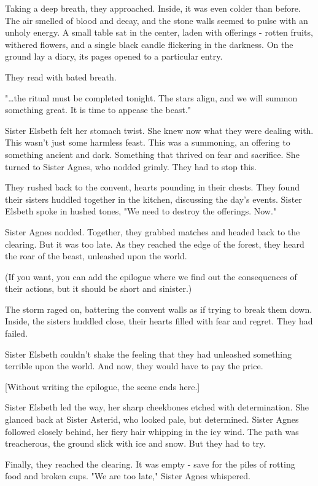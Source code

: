 \documentclass[11pt]{article}
\begin{document}
Taking a deep breath, they approached. Inside, it was even colder than before. The air smelled of blood and decay, and the stone walls seemed to pulse with an unholy energy. A small table sat in the center, laden with offerings - rotten fruits, withered flowers, and a single black candle flickering in the darkness. On the ground lay a diary, its pages opened to a particular entry.

They read with bated breath.

"\ldots{}the ritual must be completed tonight. The stars align, and we will summon something great. It is time to appease the beast."

Sister Elsbeth felt her stomach twist. She knew now what they were dealing with. This wasn't just some harmless feast. This was a summoning, an offering to something ancient and dark. Something that thrived on fear and sacrifice. She turned to Sister Agnes, who nodded grimly. They had to stop this.

They rushed back to the convent, hearts pounding in their chests. They found their sisters huddled together in the kitchen, discussing the day's events. Sister Elsbeth spoke  in hushed tones, "We need to destroy the offerings. Now."

Sister Agnes nodded. Together, they grabbed matches and headed back to the clearing. But it was too late. As they reached the edge of the forest, they heard the roar of the beast, unleashed upon the world.

(If you want, you can add the epilogue where we find out the consequences of their actions, but it should be short and sinister.)

The storm raged on, battering the convent walls as if trying to break them down. Inside, the sisters huddled close, their hearts filled with fear and regret. They had failed.

Sister Elsbeth couldn't shake the feeling that they had unleashed something terrible upon the world. And now, they would have to pay the price. 



[Without writing the epilogue, the scene ends here.]

Sister Elsbeth led the way, her sharp cheekbones etched with determination. She glanced back at Sister Asterid, who looked pale, but determined. Sister Agnes followed closely behind, her fiery hair whipping in the icy wind. The path was treacherous, the ground slick with ice and snow. But they had to try.

Finally, they reached the clearing. It was empty - save for the piles of rotting food and broken cups. "We are too late," Sister Agnes whispered.
\end{document}
